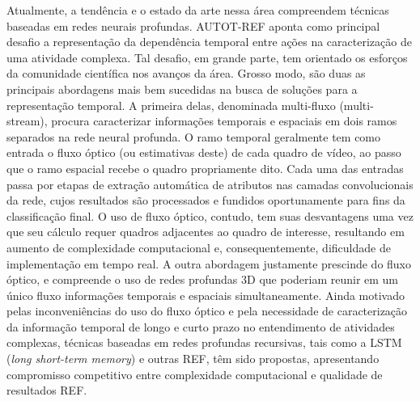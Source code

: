 %
Atualmente, a tendência e o estado da arte nessa área compreendem técnicas baseadas em redes neurais profundas. AUTOT-REF aponta como principal desafio a representação da dependência temporal entre ações na caracterização de uma atividade complexa. Tal desafio, em grande parte, tem orientado os esforços da comunidade científica nos avanços da área. 
%
Grosso modo, são duas as principais abordagens mais bem sucedidas na busca de soluções para a representação temporal. A primeira delas, denominada multi-fluxo (multi-stream), procura caracterizar informações temporais e espaciais em dois ramos separados na rede neural profunda. O ramo temporal geralmente tem como entrada o fluxo óptico (ou estimativas deste) de cada quadro de vídeo, ao passo que o ramo espacial recebe o quadro propriamente dito. Cada uma das entradas passa por etapas de extração automática de atributos nas camadas convolucionais da rede, cujos resultados são processados e fundidos oportunamente para fins da classificação final. O uso de fluxo óptico, contudo, tem suas desvantagens uma vez que seu cálculo requer quadros adjacentes ao quadro de interesse, resultando em aumento de complexidade computacional e, consequentemente, dificuldade de implementação em tempo real. A outra abordagem justamente prescinde do fluxo óptico, e compreende o uso de redes profundas 3D que poderiam reunir em um único fluxo informações temporais e espaciais simultaneamente. 
%
Ainda motivado pelas inconveniências do uso do fluxo óptico e pela necessidade de caracterização da informação temporal de longo e curto prazo no entendimento de atividades complexas, técnicas baseadas em redes profundas recursivas, tais como a LSTM (\emph{long short-term memory}) e outras REF, têm sido propostas, apresentando compromisso competitivo entre complexidade computacional e qualidade de resultados REF.

